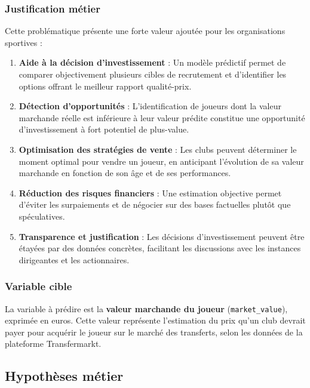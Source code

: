 \documentclass[12pt,a4paper]{article}
\begin{document}
\subsubsection{Justification métier}

Cette problématique présente une forte valeur ajoutée pour les organisations sportives :

\begin{enumerate}[leftmargin=*]
    \item \textbf{Aide à la décision d'investissement} : Un modèle prédictif permet de comparer objectivement plusieurs cibles de recrutement et d'identifier les options offrant le meilleur rapport qualité-prix.
    
    \item \textbf{Détection d'opportunités} : L'identification de joueurs dont la valeur marchande réelle est inférieure à leur valeur prédite constitue une opportunité d'investissement à fort potentiel de plus-value.
    
    \item \textbf{Optimisation des stratégies de vente} : Les clubs peuvent déterminer le moment optimal pour vendre un joueur, en anticipant l'évolution de sa valeur marchande en fonction de son âge et de ses performances.
    
    \item \textbf{Réduction des risques financiers} : Une estimation objective permet d'éviter les surpaiements et de négocier sur des bases factuelles plutôt que spéculatives.
    
    \item \textbf{Transparence et justification} : Les décisions d'investissement peuvent être étayées par des données concrètes, facilitant les discussions avec les instances dirigeantes et les actionnaires.
\end{enumerate}

\subsubsection{Variable cible}

La variable à prédire est la \textbf{valeur marchande du joueur} (\texttt{market\_value}), exprimée en euros. Cette valeur représente l'estimation du prix qu'un club devrait payer pour acquérir le joueur sur le marché des transferts, selon les données de la plateforme Transfermarkt.

\newpage

\subsection{Hypothèses métier}
\end{document}
